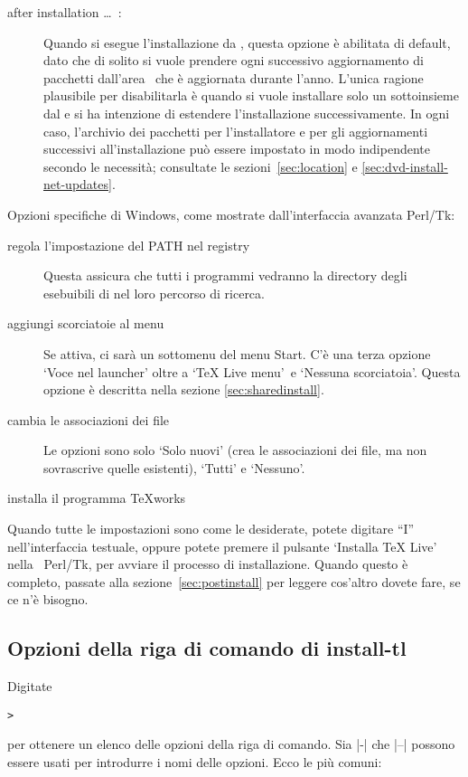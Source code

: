 \documentclass{article}
\begin{document}
\begin{description}
\item[after installation \ldots\ \CTAN:] Quando si esegue l'installazione
  da \DVD, questa opzione è abilitata di default, dato che di solito si
  vuole prendere ogni successivo aggiornamento di pacchetti dall'area
  \CTAN\ che è aggiornata durante l'anno. L'unica ragione plausibile per
  disabilitarla è quando si vuole installare solo un sottoinsieme dal \DVD
  e si ha intenzione di estendere l'installazione successivamente. In
  ogni caso, l'archivio dei pacchetti per l'installatore e per gli
  aggiornamenti successivi all'installazione può essere impostato in modo
  indipendente secondo le necessità; consultate le sezioni~\ref{sec:location}
  e \ref{sec:dvd-install-net-updates}.
\end{description}
Opzioni specifiche di Windows, come mostrate dall'interfaccia avanzata
Perl/Tk:
\begin{description}
\item[regola l'impostazione del PATH nel registry] Questa assicura che tutti
  i programmi vedranno la directory degli esebuibili di \TL{} nel loro
  percorso di ricerca.

\item[aggiungi scorciatoie al menu] Se attiva, ci sarà un sottomenu \TL{}
   del menu Start. C'è una terza opzione `Voce nel launcher' oltre a
  `TeX Live menu' e `Nessuna scorciatoia'. Questa opzione è descritta nella
  sezione \ref{sec:sharedinstall}.

\item[cambia le associazioni dei file] Le opzioni sono solo `Solo nuovi'
  (crea le associazioni dei file, ma non sovrascrive quelle esistenti),
  `Tutti' e `Nessuno'.

\item[installa il programma \TeX{}works]
\end{description}
Quando tutte le impostazioni sono come le desiderate, potete digitare
``I'' nell'interfaccia testuale, oppure potete premere il pulsante
`Installa TeX Live' nella \GUI\ Perl/Tk, per avviare il processo di
installazione. Quando questo è completo, passate alla
sezione~\ref{sec:postinstall} per leggere cos'altro dovete fare, se
ce n'è bisogno.


\subsection{Opzioni della riga di comando di install-tl}
\label{sec:cmdline}

Digitate
\begin{alltt}
> 
\end{alltt}
per ottenere un elenco delle opzioni della riga di comando. Sia |-| che
|--| possono essere usati per introdurre i nomi delle opzioni. Ecco le più
comuni:
\end{document}
